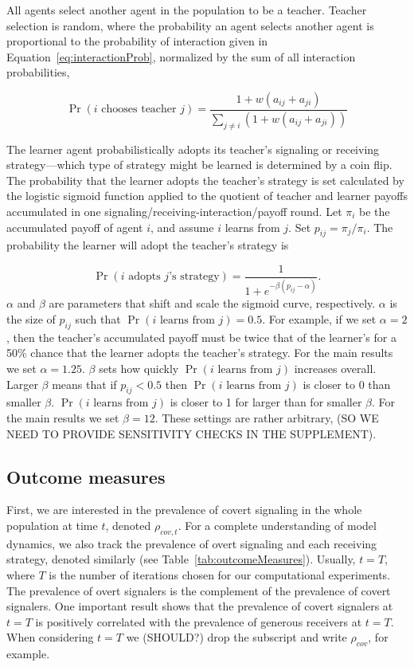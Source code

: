 \documentclass[11pt,letterpaper]{article}
\begin{document}
All agents select another agent in the population to be a teacher.
Teacher selection is random, where the probability an agent selects another
agent is proportional to the probability of interaction given in 
Equation~\ref{eq:interactionProb}, normalized by the sum of all interaction
probabilities,

\begin{equation}
  \Pr(\text{$i$ chooses teacher $j$}) = 
    \frac{1 + w(a_{ij} + a_{ji})}{\sum_{j \neq i}(1 + w(a_{ij} + a_{ji}))}
\end{equation}

The learner agent probabilistically adopts its teacher's signaling or receiving 
strategy---which type of strategy might be learned is determined by a coin flip. 
The probability that the learner adopts the teacher's strategy is set 
calculated by the logistic sigmoid function applied to the quotient of 
teacher and learner payoffs accumulated in one
signaling/receiving-interaction/payoff round.
Let $\pi_{i}$ be the accumulated payoff of agent $i$, and assume $i$ learns
from $j$. Set $p_{ij} = \pi_{j} / \pi_i$. 
The probability the learner will adopt the teacher's strategy is

\begin{equation}
  \Pr(\text{$i$ adopts $j$'s strategy}) = \frac{1}{1 + e^{-\beta(p_{ij} - \alpha)}}.
\end{equation}
\noindent
$\alpha$ and $\beta$ are parameters that shift and scale the sigmoid curve, respectively. 
$\alpha$ is the size of $p_{ij}$ such that $\Pr(\text{$i$ learns from $j$}) = 0.5$. %
For example, if we set $\alpha = 2$, then the teacher's accumulated payoff
must be twice that of the learner's for a 50\% chance that the learner 
adopts the teacher's strategy. 
For the main results we set $\alpha=1.25$. $\beta$ sets how quickly 
$\Pr(\text{$i$ learns from $j$})$ increases overall. Larger $\beta$ means that
if $p_{ij} < 0.5$ then $\Pr(\text{$i$ learns from $j$})$ is closer to 0 than smaller $\beta$. 
$\Pr(\text{$i$ learns from $j$})$ is closer to 1 for larger than for smaller $\beta$. For the main
results we set $\beta = 12$. These settings are rather arbitrary, (SO WE NEED
TO PROVIDE SENSITIVITY CHECKS IN THE SUPPLEMENT).

\subsection{Outcome measures}

First, we are interested in the prevalence of covert signaling in the
whole population at time
$t$, denoted $\rho_{cov,t}$. For a complete understanding of model dynamics,
we also track the prevalence of overt signaling and each receiving strategy,
denoted similarly (see Table~\ref{tab:outcomeMeasures}).
Usually, $t=T$, where $T$ is the number of iterations chosen for our 
computational experiments. The prevalence of overt signalers is the complement 
of the prevalence of covert signalers. One important result shows that the
prevalence of covert signalers at $t=T$ is positively correlated with the
prevalence of generous receivers at $t=T$. When considering $t=T$ we (SHOULD?)
drop the subscript and write $\rho_{cov}$, for example.
\end{document}
